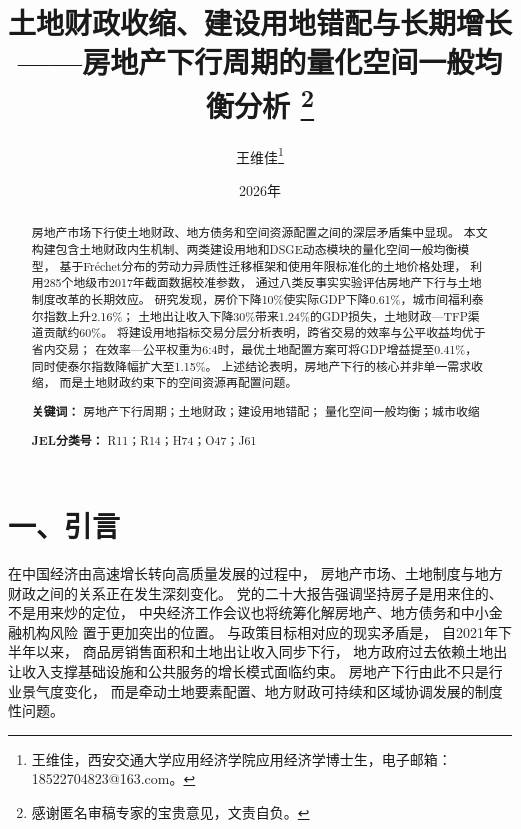 \documentclass[UTF8,a4paper,12pt]{ctexart}
\theoremstyle{plain}
\theoremstyle{definition}
\theoremstyle{remark}
\begin{document}

\title{
  \vspace{-1cm}
  {\bfseries
  土地财政收缩、建设用地错配与长期增长}\\[6pt]
  {
  ——房地产下行周期的量化空间一般均衡分析}
  \thanks{感谢匿名审稿专家的宝贵意见，文责自负。}
}

\author{
  {王维佳\thanks{王维佳，西安交通大学应用经济学院应用经济学博士生，电子邮箱：18522704823@163.com。}}
}

\date{ 2026年}
\maketitle
\thispagestyle{empty}

\begin{abstract}
\noindent
房地产市场下行使土地财政、地方债务和空间资源配置之间的深层矛盾集中显现。
本文构建包含土地财政内生机制、两类建设用地和DSGE动态模块的量化空间一般均衡模型，
基于Fréchet分布的劳动力异质性迁移框架和使用年限标准化的土地价格处理，
利用285个地级市2017年截面数据校准参数，
通过八类反事实实验评估房地产下行与土地制度改革的长期效应。
研究发现，房价下降10\%使实际GDP下降0.61\%，城市间福利泰尔指数上升2.16\%；
土地出让收入下降30\%带来1.24\%的GDP损失，土地财政—TFP渠道贡献约60\%。
将建设用地指标交易分层分析表明，跨省交易的效率与公平收益均优于省内交易；
在效率—公平权重为6:4时，最优土地配置方案可将GDP增益提至0.41\%，
同时使泰尔指数降幅扩大至1.15\%。
上述结论表明，房地产下行的核心并非单一需求收缩，
而是土地财政约束下的空间资源再配置问题。

\medskip
\noindent\textbf{关键词：}
房地产下行周期；土地财政；建设用地错配；
量化空间一般均衡；城市收缩

\medskip
\noindent\textbf{JEL分类号：}
R11；R14；H74；O47；J61
\end{abstract}

\clearpage
{}
\setcounter{page}{1}

\setcounter{secnumdepth}{0}
\section{一、引言}

在中国经济由高速增长转向高质量发展的过程中，
房地产市场、土地制度与地方财政之间的关系正在发生深刻变化。
党的二十大报告强调坚持房子是用来住的、不是用来炒的定位，
中央经济工作会议也将统筹化解房地产、地方债务和中小金融机构风险
置于更加突出的位置。
与政策目标相对应的现实矛盾是，
自2021年下半年以来，
商品房销售面积和土地出让收入同步下行，
地方政府过去依赖土地出让收入支撑基础设施和公共服务的增长模式面临约束。
房地产下行由此不只是行业景气度变化，
而是牵动土地要素配置、地方财政可持续和区域协调发展的制度性问题。
\end{document}
